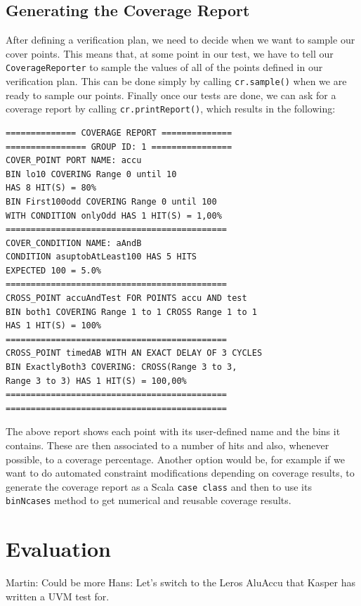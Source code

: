 \documentclass[conference]{IEEEtran}
\newcommand{\martin}[1]{{\color{blue} Martin: #1}}
\newcommand{\hjd}[1]{{\color{pink} Hans: #1}}
\begin{document}
\subsection{Generating the Coverage Report}
After defining a verification plan, we need to decide when we want to sample our cover points. This means that, at some point in our test, we have to tell our \texttt{CoverageReporter} to sample the values of all of the points defined in our verification plan. 
This can be done simply by calling \texttt{cr.sample()} when we are ready to sample our points. 
Finally once our tests are done, we can ask for a coverage report by calling \texttt{cr.printReport()}, which results in the following: 
\begin{verbatim}
============== COVERAGE REPORT ==============
================ GROUP ID: 1 ================
COVER_POINT PORT NAME: accu
BIN lo10 COVERING Range 0 until 10 
HAS 8 HIT(S) = 80%
BIN First100odd COVERING Range 0 until 100 
WITH CONDITION onlyOdd HAS 1 HIT(S) = 1,00%
============================================
COVER_CONDITION NAME: aAndB
CONDITION asuptobAtLeast100 HAS 5 HITS 
EXPECTED 100 = 5.0%
============================================
CROSS_POINT accuAndTest FOR POINTS accu AND test
BIN both1 COVERING Range 1 to 1 CROSS Range 1 to 1 
HAS 1 HIT(S) = 100%
============================================
CROSS_POINT timedAB WITH AN EXACT DELAY OF 3 CYCLES
BIN ExactlyBoth3 COVERING: CROSS(Range 3 to 3, 
Range 3 to 3) HAS 1 HIT(S) = 100,00%
============================================
============================================
\end{verbatim}
The above report shows each point with its user-defined name and the bins it contains. These are then associated to a number of hits and also, whenever possible, to a coverage percentage.
Another option would be, for example if we want to do automated constraint modifications depending on coverage results, to generate the coverage report as a Scala \texttt{case class} and then to use its \texttt{binNcases} method to get numerical and reusable coverage results.  

\section{Evaluation}

\martin{Could be more} \hjd{Let's switch to the Leros AluAccu that Kasper has written a UVM test for.}

\end{document}
